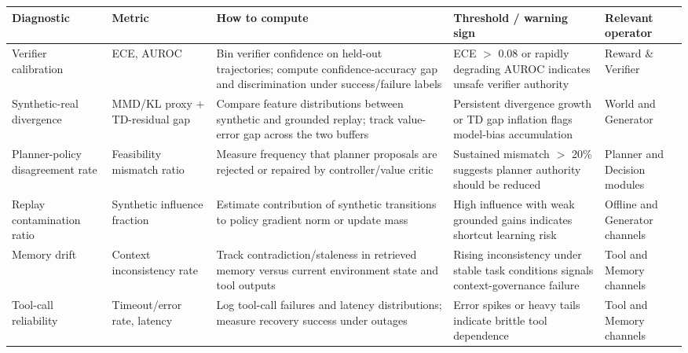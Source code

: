 ﻿\documentclass[conference]{IEEEtran}
\begin{document}
\begin{table}[t]
\centering
\footnotesize
\setlength{\tabcolsep}{4pt}
\begin{tabularx}{\textwidth}{P{2.1cm}P{1.7cm}P{3.7cm}P{2.6cm}Y}
\toprule
\textbf{Diagnostic} & \textbf{Metric} & \textbf{How to compute} & \textbf{Threshold / warning sign} & \textbf{Relevant operator}\\
\midrule
Verifier calibration & ECE, AUROC & Bin verifier confidence on held-out trajectories; compute confidence-accuracy gap and discrimination under success/failure labels & ECE $>$ 0.08 or rapidly degrading AUROC indicates unsafe verifier authority & Reward \& Verifier \cite{arxiv_p_2602_06493,arxiv_p_2602_12579,arxiv_p_2602_02395}\\
Synthetic-real divergence & MMD/KL proxy + TD-residual gap & Compare feature distributions between synthetic and grounded replay; track value-error gap across the two buffers & Persistent divergence growth or TD gap inflation flags model-bias accumulation & World and Generator \cite{arxiv_p_2602_02454,arxiv_p_2602_11075,arxiv_p_2601_08107}\\
Planner-policy disagreement rate & Feasibility mismatch ratio & Measure frequency that planner proposals are rejected or repaired by controller/value critic & Sustained mismatch $>$ 20\% suggests planner authority should be reduced & Planner and Decision modules \cite{arxiv_p_2204_01691,arxiv_p_2405_01534,arxiv_p_2602_16165}\\
Replay contamination ratio & Synthetic influence fraction & Estimate contribution of synthetic transitions to policy gradient norm or update mass & High influence with weak grounded gains indicates shortcut learning risk & Offline and Generator channels \cite{arxiv_p_2310_20587,arxiv_p_2505_18098,arxiv_p_2602_03305}\\
Memory drift & Context inconsistency rate & Track contradiction/staleness in retrieved memory versus current environment state and tool outputs & Rising inconsistency under stable task conditions signals context-governance failure & Tool and Memory channels \cite{arxiv_p_2404_03648,arxiv_p_2602_00994,arxiv_p_2601_07264}\\
Tool-call reliability & Timeout/\allowbreak error rate, latency & Log tool-call failures and latency distributions; measure recovery success under outages & Error spikes or heavy tails indicate brittle tool dependence & Tool and Memory channels \cite{arxiv_p_2404_03648,arxiv_p_2601_02439,arxiv_p_2601_03555}\\

\end{tabularx}
\end{table}
\end{document}
